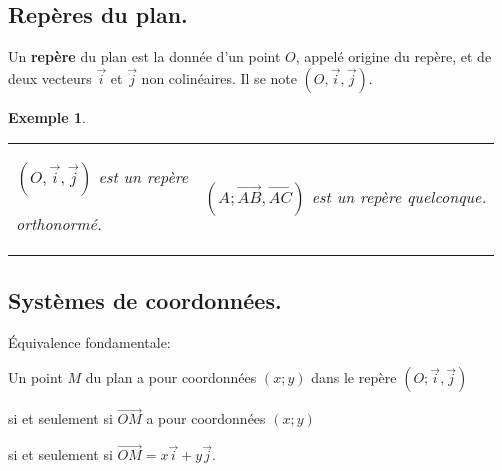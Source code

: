 \documentclass[a4paper,11pt]{article}
\theoremstyle{break}
\newcounter{enonce}
\newtheorem{exemple}[enonce]{Exemple}
\begin{document}
    \subsection{Repères du plan.}
  
  
   \begin{definition}
      Un \textbf{repère} du plan est la donnée d'un point $O$, appelé origine du repère, et de deux vecteurs
      $\vec{i}$ et $\vec{j}$ non colinéaires. Il se note $(O,\vec{i},\vec{j})$.
   \end{definition}
   
    \begin{exemple}
    ~
    \begin{center}
    
   
   \begin{tabular}{p{5.7cm}p{4.7cm}}
$(O,\vec{i},\vec{j})$ est un repère 

{orthonormé}.
&
 $(A;\vec{AB},\vec{AC})$ est un repère quelconque.
\end{tabular}
   
   \end{center}
   \end{exemple}
   
   \subsection{Systèmes de coordonnées.}
  
  
   \begin{proposition}\'Equivalence fondamentale: 
    
    Un point $M$ du plan a pour coordonnées $(x;y)$ dans le repère $(O;\vec{i},\vec{j})$
    
    si et seulement si $\vec{OM}$ a pour coordonnées $(x;y)$ 

    si et seulement si $\vec{OM}=x \vec{i}+y \vec{j}$.
  
   \end{proposition}
   
\end{document}

